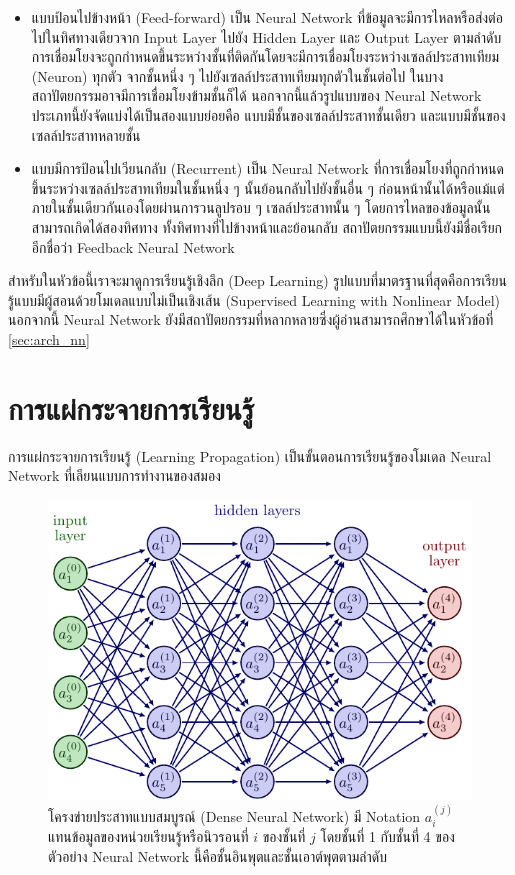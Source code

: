 \begin{itemize}[topsep=0pt,noitemsep]\setlength\itemsep{0.5em}
    \item แบบป้อนไปข้างหน้า (Feed-forward) เป็น Neural Network ที่ข้อมูลจะมีการไหลหรือส่งต่อไปในทิศทางเดียวจาก Input Layer ไปยัง Hidden Layer และ Output Layer ตามลำดับ การเชื่อมโยงจะถูกกำหนดขึ้นระหว่างชั้นที่ติดกันโดยจะมีการเชื่อมโยงระหว่างเซลล์ประสาทเทียม (Neuron) ทุกตัว จากชั้นหนึ่ง ๆ ไปยังเซลล์ประสาทเทียมทุกตัวในชั้นต่อไป ในบางสถาปัตยกรรมอาจมีการเชื่อมโยงข้ามชั้นก็ได้ นอกจากนี้แล้วรูปแบบของ Neural Network ประเภทนี้ยังจัดแบ่งได้เป็นสองแบบย่อยคือ แบบมีชั้นของเซลล์ประสาทชั้นเดียว และแบบมีชั้นของเซลล์ประสาทหลายชั้น

    \item แบบมีการป้อนไปเวียนกลับ (Recurrent) เป็น Neural Network ที่การเชื่อมโยงที่ถูกกำหนดขึ้นระหว่างเซลล์ประสาทเทียมในชั้นหนึ่ง ๆ นั้นย้อนกลับไปยังชั้นอื่น ๆ ก่อนหน้านั้นได้หรือแม้แต่ภายในชั้นเดียวกันเองโดยผ่านการวนลูปรอบ ๆ เซลล์ประสาทนั้น ๆ โดยการไหลของข้อมูลนั้นสามารถเกิดได้สองทิศทาง ทั้งทิศทางที่ไปข้างหน้าและย้อนกลับ สถาปัตยกรรมแบบนี้ยังมีชื่อเรียกอีกชื่อว่า Feedback Neural Network
\end{itemize}

สำหรับในหัวข้อนี้เราจะมาดูการเรียนรู้เชิงลึก (Deep Learning) รูปแบบที่มาตรฐานที่สุดคือการเรียนรู้แบบมีผู้สอนด้วยโมเดลแบบไม่เป็นเชิงเส้น (Supervised Learning with Nonlinear Model) นอกจากนี้ Neural Network ยังมีสถาปัตยกรรมที่หลากหลายซึ่งผู้อ่านสามารถศึกษาได้ในหัวข้อที่ \ref{sec:arch_nn}

\section{การแผ่กระจายการเรียนรู้}

การแผ่กระจายการเรียนรู้ (Learning Propagation) เป็นขั้นตอนการเรียนรู้ของโมเดล Neural Network ที่เลียนแบบการทำงานของสมอง

\begin{figure}[H]
    \centering
    \includegraphics[width=0.7\linewidth]{fig/dense_neural_net.pdf}
    \caption{โครงข่ายประสาทแบบสมบูรณ์ (Dense Neural Network) มี Notation $a^{(j)}_{i}$ แทนข้อมูลของหน่วยเรียนรู้หรือนิวรอนที่ $i$ ของชั้นที่ $j$ โดยชั้นที่ 1 กับชั้นที่ 4 ของตัวอย่าง Neural Network นี้คือชั้นอินพุตและชั้นเอาต์พุตตามลำดับ}
    \label{fig:dense_neural_net}
\end{figure}

